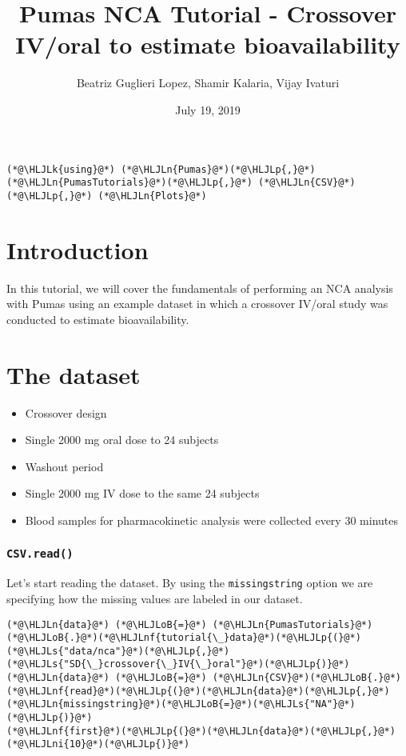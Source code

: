 \documentclass[12pt,a4paper]{article}
\title{ Pumas NCA Tutorial - Crossover IV/oral to estimate bioavailability }
\author{ Beatriz Guglieri Lopez, Shamir Kalaria, Vijay Ivaturi }
\date{ July 19, 2019 }
\newcommand{\HLJLk}[1]{\textcolor[RGB]{148,91,176}{\textbf{#1}}}
\newcommand{\HLJLn}[1]{#1}
\newcommand{\HLJLnf}[1]{\textcolor[RGB]{66,102,213}{#1}}
\newcommand{\HLJLs}[1]{\textcolor[RGB]{201,61,57}{#1}}
\newcommand{\HLJLni}[1]{\textcolor[RGB]{59,151,46}{#1}}
\newcommand{\HLJLoB}[1]{\textcolor[RGB]{102,102,102}{\textbf{#1}}}
\newcommand{\HLJLp}[1]{#1}
\begin{document}
\maketitle


\begin{lstlisting}
(*@\HLJLk{using}@*) (*@\HLJLn{Pumas}@*)(*@\HLJLp{,}@*) (*@\HLJLn{PumasTutorials}@*)(*@\HLJLp{,}@*) (*@\HLJLn{CSV}@*)(*@\HLJLp{,}@*) (*@\HLJLn{Plots}@*)
\end{lstlisting}


\section{Introduction}
In this tutorial, we will cover the fundamentals of performing an NCA analysis with Pumas using an example dataset in which a crossover IV/oral study was conducted to estimate bioavailability.

\section{The dataset}
\begin{itemize}
\item Crossover design


\item Single 2000 mg oral dose to 24 subjects


\item Washout period


\item Single 2000 mg IV dose to the same 24 subjects


\item Blood samples for pharmacokinetic analysis were collected every 30 minutes

\end{itemize}
\subsubsection{\texttt{CSV.read()}}
Let's start reading the dataset. By using the \texttt{missingstring} option we are specifying how the missing values are labeled in our dataset.


\begin{lstlisting}
(*@\HLJLn{data}@*) (*@\HLJLoB{=}@*) (*@\HLJLn{PumasTutorials}@*)(*@\HLJLoB{.}@*)(*@\HLJLnf{tutorial{\_}data}@*)(*@\HLJLp{(}@*)(*@\HLJLs{"data/nca"}@*)(*@\HLJLp{,}@*)(*@\HLJLs{"SD{\_}crossover{\_}IV{\_}oral"}@*)(*@\HLJLp{)}@*)
(*@\HLJLn{data}@*) (*@\HLJLoB{=}@*) (*@\HLJLn{CSV}@*)(*@\HLJLoB{.}@*)(*@\HLJLnf{read}@*)(*@\HLJLp{(}@*)(*@\HLJLn{data}@*)(*@\HLJLp{,}@*)(*@\HLJLn{missingstring}@*)(*@\HLJLoB{=}@*)(*@\HLJLs{"NA"}@*)(*@\HLJLp{)}@*)
(*@\HLJLnf{first}@*)(*@\HLJLp{(}@*)(*@\HLJLn{data}@*)(*@\HLJLp{,}@*)(*@\HLJLni{10}@*)(*@\HLJLp{)}@*)
\end{lstlisting}
\end{document}
